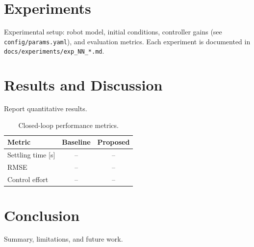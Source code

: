 \documentclass[conference]{IEEEtran}
\begin{document}
\section{Experiments}
\label{sec:exp}
Experimental setup: robot model, initial conditions, controller gains
(see \texttt{config/params.yaml}), and evaluation metrics. Each experiment is
documented in \texttt{docs/experiments/exp\_NN\_*.md}.


\section{Results and Discussion}
\label{sec:results}
Report quantitative results.

\begin{table}[t]
  \centering
  \caption{Closed-loop performance metrics.}
  \label{tab:metrics}
  \begin{tabular}{lcc}
    \toprule
    Metric & Baseline & Proposed \\
    \midrule
    Settling time [s] & -- & -- \\
    RMSE              & -- & -- \\
    Control effort    & -- & -- \\
    \bottomrule
  \end{tabular}
\end{table}

\section{Conclusion}
\label{sec:conclusion}
Summary, limitations, and future work.



\end{document}
